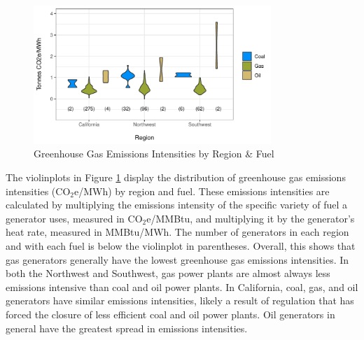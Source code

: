 \begin{figure}
    \centering
    \caption{Greenhouse Gas Emissions Intensities by Region \& Fuel \label{ghg_intensity}} 
    \includegraphics[width=0.8\textwidth]{figures/chapter5_figures/EI_region_violin.pdf}
\end{figure}

The violinplots in Figure \ref{ghg_intensity} display the distribution of greenhouse gas emissions intensities (CO$_2$e/MWh) by region and fuel. These emissions intensities are calculated by multiplying the emissions intensity of the specific variety of fuel a generator uses, measured in CO$_2$e/MMBtu, and multiplying it by the generator's heat rate, measured in MMBtu/MWh. The number of generators in each region and with each fuel is below the violinplot in parentheses. Overall, this shows that gas generators generally have the lowest greenhouse gas emissions intensities. In both the Northwest and Southwest, gas power plants are almost always less emissions intensive than coal and oil power plants. In California, coal, gas, and oil generators have similar emissions intensities, likely a result of regulation that has forced the closure of less efficient coal and oil power plants. Oil generators in general have the greatest spread in emissions intensities. 

